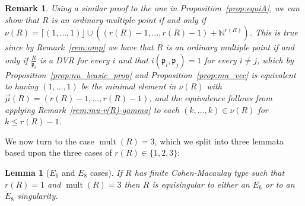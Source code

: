 \documentclass{article}
\newtheorem{lemma}[theorem]{Lemma}
\newtheorem{remark}[theorem]{Remark}
\DeclareMathOperator{\mult}{mult}
\numberwithin{theorem}{section}
\begin{document}
\begin{remark}
    \textup{Using a similar proof to the one in Proposition~\ref{prop:equiA}, we can show that $R$ is an ordinary multiple point if and only if $\nu(R) = \lceil (1, \dots, 1)\rfloor \cup ((r(R)-1, \dots, r(R)-1) + \mathbb{N}^{r(R)})$. This is true since by Remark~\ref{rem:omp} we have that $R$ is an ordinary multiple point if and only if $\frac{R}{\mathfrak{p}_i}$ is a DVR for every $i$ and that $i(\mathfrak{p}_i, \mathfrak{p}_j)=1$ for every $i \neq j$, which by Proposition~\ref{prop:nu_beasic_prop} and Proposition~\ref{prop:mu_vec} is equivalent to having $(1,\dots,1)$ be the minimal element in $\nu(R)$ with $\vec{\mu}(R)=(r(R)-1, \dots, r(R)-1)$, and the equivalence follows from applying Remark~\ref{rem:mu-r(R)-gamma} to each $(k, \dots,k) \in \nu(R)$ for $k \leq r(R)-1$. }
\end{remark}

We now turn to the case $\mult(R)=3$, which we split into three lemmata based upon the three cases of $r(R) \in \{1,2,3\}$: 

\begin{lemma}[$E_6$ and $E_8$ cases]\label{lem:equi31}
    If $R$ has finite Cohen-Macaulay type such that $r(R)=1$ and $\mult(R)=3$ then $R$ is equisingular to either an $E_6$ or to an $E_8$ singularity. 
\end{lemma}
\end{document}
